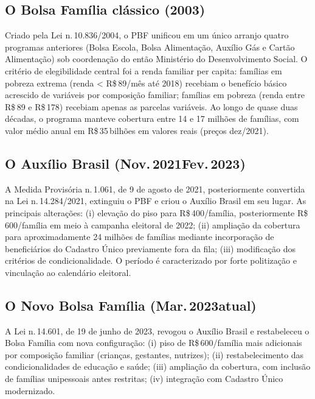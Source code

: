 \documentclass[12pt,a4paper,oneside]{article}
\newcommand{\rs}{R\$\,}
\begin{document}
\subsection{O Bolsa Família clássico (2003)}

Criado pela Lei n.\,10.836/2004, o PBF unificou em um único arranjo
quatro programas anteriores (Bolsa Escola, Bolsa Alimentação,
Auxílio Gás e Cartão Alimentação) sob coordenação do então
Ministério do Desenvolvimento Social. O critério de elegibilidade
central foi a renda familiar per capita: famílias em pobreza
extrema (renda < \rs 89/mês até 2018) recebiam o benefício básico
acrescido de variáveis por composição familiar; famílias em pobreza
(renda entre \rs 89 e \rs 178) recebiam apenas as parcelas
variáveis. Ao longo de quase duas décadas, o programa manteve
cobertura entre 14 e 17 milhões de famílias, com valor médio anual
em \rs 35\,bilhões em valores reais (preços
dez/2021).

\subsection{O Auxílio Brasil (Nov.\,2021\textendash Fev.\,2023)}

A Medida Provisória n.\,1.061, de 9 de agosto de 2021,
posteriormente convertida na Lei n.\,14.284/2021, extinguiu o PBF e
criou o Auxílio Brasil em seu lugar. As principais alterações:
(i) elevação do piso para \rs 400/família, posteriormente
\rs 600/família em meio à campanha eleitoral de 2022;
(ii) ampliação da cobertura para aproximadamente 24 milhões de
famílias mediante incorporação de beneficiários do Cadastro Único
previamente fora da fila; (iii) modificação dos critérios de
condicionalidade. O período é caracterizado por forte politização e
vinculação ao calendário eleitoral.

\subsection{O Novo Bolsa Família (Mar.\,2023\textendash atual)}

A Lei n.\,14.601, de 19 de junho de 2023, revogou o Auxílio Brasil e
restabeleceu o Bolsa Família com nova configuração: (i) piso de
\rs 600/família mais adicionais por composição familiar (crianças,
gestantes, nutrizes); (ii) restabelecimento das condicionalidades
de educação e saúde; (iii) ampliação da cobertura, com inclusão de
famílias unipessoais antes restritas; (iv) integração com
Cadastro Único modernizado.
\end{document}
